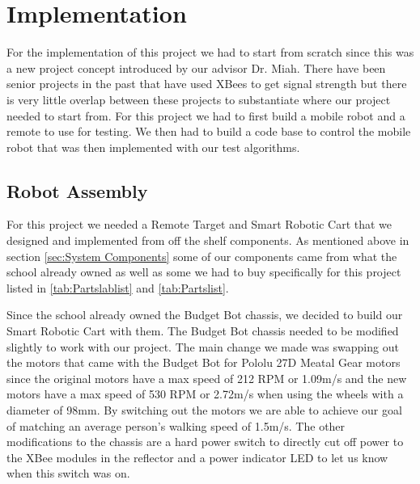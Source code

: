\chapter{Implementation}
\label{ch: Chapter5}

For the implementation of this project we had to start from scratch since this was a new project concept introduced by our advisor Dr. Miah. There have been senior projects in the past that have used XBees to get signal strength but there is very little overlap between these projects to substantiate where our project needed to start from. For this project we had to first build a mobile robot and a remote to use for testing. We then had to build a code base to control the mobile robot that was then implemented with our test algorithms.

\section{Robot Assembly}
\label{sec:Robot Assembly}

For this project we needed a Remote Target and Smart Robotic Cart that we designed and implemented from off the shelf components.  As mentioned above in section \ref{sec:System Components} some of our components came from what the school already owned as well as some we had to buy specifically for this project listed in \autoref{tab:Partslablist} and \autoref{tab:Partslist}.

\vspace*{12pt}
\noindent
Since the school already owned the Budget Bot chassis, we decided to build our Smart Robotic Cart with them. The Budget Bot chassis needed to be modified slightly to work with our project. The main change we made was swapping out the motors that came with the Budget Bot for Pololu 27D Meatal Gear motors since the original motors have a max speed of 212 RPM or 1.09m/s and the new motors have a max speed of 530 RPM or 2.72m/s when using the wheels with a diameter of 98mm. By switching out the motors we are able to achieve our goal of matching an average person's walking speed of 1.5m/s. The other modifications to the chassis are a hard power switch to directly cut off power to the XBee modules in the reflector and a power indicator LED to let us know when this switch was on.

